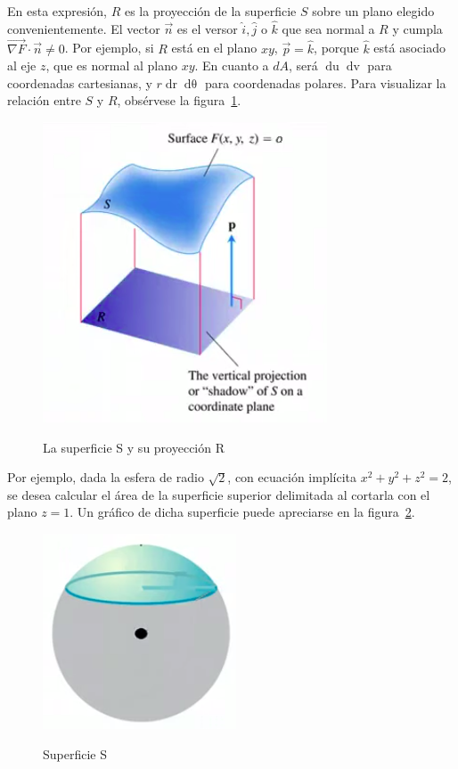 \documentclass{article}
\begin{document}
En esta expresión, $R$ es la proyección de la superficie $S$ sobre un plano elegido convenientemente. El vector $\overrightarrow{n}$ es el versor $\hat{i}, \hat{j}$ o $\hat{k}$ que sea normal a $R$ y cumpla $\overrightarrow{ \nabla F } \cdot \overrightarrow{n} \neq 0$. Por ejemplo, si $R$ está en el plano $xy$, $\overrightarrow{p} = \hat{k}$, porque $\hat{k}$ está asociado al eje $z$, que es normal al plano $xy$. En cuanto a $dA$, será $\mathop{du} \mathop{dv}$ para coordenadas cartesianas, y $r \mathop{dr} \mathop{d\theta}$ para coordenadas polares. Para visualizar la relación entre $S$ y $R$, obsérvese la figura~\ref{fig:isi}.

\begin{figure}[ht]
\centering
\caption{La superficie S y su proyección R}
\includegraphics[scale=0.8]{img/integrales/proyeccion_superficie.png}
\label{fig:isi}
\end{figure}

Por ejemplo, dada la esfera de radio $\sqrt{2}$, con ecuación implícita $x^2 + y^2 + z^2 = 2$, se desea calcular el área de la superficie superior delimitada al cortarla con el plano $z = 1$. Un gráfico de dicha superficie puede apreciarse en la figura~\ref{fig:isiej}.

\begin{figure}[ht]
\centering
\caption{Superficie S}
\includegraphics[scale=0.8]{img/integrales/area_superficie_implicita.png}
\label{fig:isiej}
\end{figure}
\end{document}
